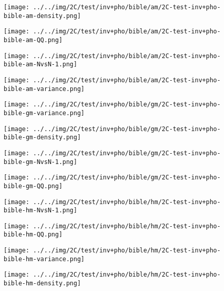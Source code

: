 \begin{figure}[H]
\centering	\texttt{[image: ../../img/2C/test/inv+pho/bible/am/2C-test-inv+pho-bible-am-density.png]}
\end{figure}
\begin{figure}[H]
\centering	\texttt{[image: ../../img/2C/test/inv+pho/bible/am/2C-test-inv+pho-bible-am-QQ.png]}
\end{figure}
\begin{figure}[H]
\centering	\texttt{[image: ../../img/2C/test/inv+pho/bible/am/2C-test-inv+pho-bible-am-NvsN-1.png]}
\end{figure}
\begin{figure}[H]
\centering	\texttt{[image: ../../img/2C/test/inv+pho/bible/am/2C-test-inv+pho-bible-am-variance.png]}
\end{figure}
\begin{figure}[H]
\centering	\texttt{[image: ../../img/2C/test/inv+pho/bible/gm/2C-test-inv+pho-bible-gm-variance.png]}
\end{figure}
\begin{figure}[H]
\centering	\texttt{[image: ../../img/2C/test/inv+pho/bible/gm/2C-test-inv+pho-bible-gm-density.png]}
\end{figure}
\begin{figure}[H]
\centering	\texttt{[image: ../../img/2C/test/inv+pho/bible/gm/2C-test-inv+pho-bible-gm-NvsN-1.png]}
\end{figure}
\begin{figure}[H]
\centering	\texttt{[image: ../../img/2C/test/inv+pho/bible/gm/2C-test-inv+pho-bible-gm-QQ.png]}
\end{figure}
\begin{figure}[H]
\centering	\texttt{[image: ../../img/2C/test/inv+pho/bible/hm/2C-test-inv+pho-bible-hm-NvsN-1.png]}
\end{figure}
\begin{figure}[H]
\centering	\texttt{[image: ../../img/2C/test/inv+pho/bible/hm/2C-test-inv+pho-bible-hm-QQ.png]}
\end{figure}
\begin{figure}[H]
\centering	\texttt{[image: ../../img/2C/test/inv+pho/bible/hm/2C-test-inv+pho-bible-hm-variance.png]}
\end{figure}
\begin{figure}[H]
\centering	\texttt{[image: ../../img/2C/test/inv+pho/bible/hm/2C-test-inv+pho-bible-hm-density.png]}
\end{figure}
